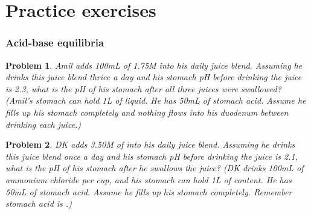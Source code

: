 \documentclass[letterpaper, 12pt]{article}
\begin{document}
\setcounter{part}{999}
\setcounter{secnumdepth}{1}
\setcounter{section}{0}
\part{Practice exercises}

\newtheorem{problem}{Problem}[section]

\section{Acid-base equilibria}

\begin{problem}
Amil adds 100mL of 1.75M  into his daily juice blend. Assuming he drinks this juice blend thrice a day and his stomach pH before drinking the juice is 2.3, what is the pH of his stomach after all three juices were swallowed? (Amil's stomach can hold 1L of liquid. He has 50mL of stomach acid. Assume he fills up his stomach completely and nothing flows into his duodenum between drinking each juice.)
\end{problem}

\begin{problem}
DK adds 3.50M of  into his daily juice blend. Assuming he drinks this juice blend once a day and his stomach pH before drinking the juice is 2.1, what is the pH of his stomach after he swallows the juice? (DK drinks 100mL of ammonium chloride per cup, and his stomach can hold 1L of content. He has 50mL of stomach acid. Assume he fills up his stomach completely. Remember stomach acid is .)
\end{problem}
\end{document}
